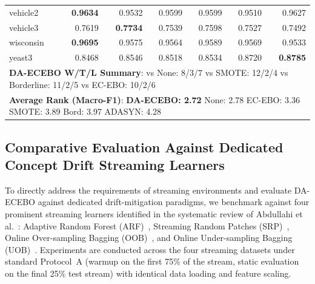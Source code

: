 \documentclass[preprint,10pt]{elsarticle}
\let\OldSubsection\subsection
\renewcommand{\subsection}{\OldSubsection}
\begin{document}
\begin{table}[!htbp]
\begin{tabular}{lrrrrrr}
vehicle2 & \textbf{0.9634} & 0.9532 & 0.9599 & 0.9599 & 0.9510 & 0.9627\\
vehicle3 & 0.7619 & \textbf{0.7734} & 0.7539 & 0.7598 & 0.7527 & 0.7492\\
wisconsin & \textbf{0.9695} & 0.9575 & 0.9564 & 0.9589 & 0.9569 & 0.9533\\
yeast3 & 0.8468 & 0.8546 & 0.8518 & 0.8534 & 0.8720 & \textbf{0.8785}\\
\midrule
\multicolumn{7}{l}{\textbf{DA-ECEBO W/T/L Summary}: vs None: 8/3/7 \quad vs SMOTE: 12/2/4 \quad vs Borderline: 11/2/5 \quad vs EC-EBO: 10/2/6}\\
\multicolumn{7}{l}{\textbf{Average Rank (Macro-F1)}: \textbf{DA-ECEBO: 2.72} \quad None: 2.78 \quad EC-EBO: 3.36 \quad SMOTE: 3.89 \quad Bord: 3.97 \quad ADASYN: 4.28}\\
\bottomrule
\end{tabular}
\end{table}

\subsection{Comparative Evaluation Against Dedicated Concept Drift Streaming Learners}\label{sec:drift_eval}
To directly address the requirements of streaming environments and evaluate DA-ECEBO against dedicated drift-mitigation paradigms, we benchmark against four prominent streaming learners identified in the systematic review of Abdullahi et al.~\cite{abdullahi2025}: Adaptive Random Forest (ARF)~\cite{gomes2017}, Streaming Random Patches (SRP)~\cite{gomes2019}, Online Over-sampling Bagging (OOB)~\cite{wang2015}, and Online Under-sampling Bagging (UOB)~\cite{wang2015}. Experiments are conducted across the four streaming datasets under standard Protocol~A (warmup on the first 75\% of the stream, static evaluation on the final 25\% test stream) with identical data loading and feature scaling.
\end{document}
